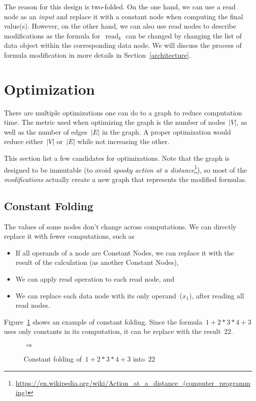 \documentclass{article}
\DeclareMathOperator{\readNode}{read}
\begin{document}
The reason for this design is two-folded.
On the one hand, we can use a read node as an \emph{input} and replace it with a constant node when computing the final value(s).
However, on the other hand, we can also use read nodes to describe modifications as the formula for~$\readNode_k$ can be changed by changing the list of data object within the corresponding data node.
We will discuss the process of formula modification in more details in Section~\ref{architecture}.

\section{Optimization}

There are multiple optimizations one can do to a graph to reduce computation time.
The metric used when optimizing the graph is the number of nodes~$|V|$, as well as the number of edges~$|E|$ in the graph.
A proper optimization would reduce either~$|V|$ or~$|E|$ while not increasing the other.

This section list a few candidates for optimizations.
Note that the graph is designed to be immutable (to avoid \emph{spooky action at a distance}\footnote{
	\url{https://en.wikipedia.org/wiki/Action_at_a_distance_(computer_programming)}
}), so most of the \emph{modifications} actually create a new graph that represents the modified formulas.

\subsection{Constant Folding}

The values of some nodes don't change across computations. We can directly replace it with fewer computations, such as
%
\begin{itemize}
	\item If all operands of a node are Constant Nodes, we can replace it with the result of the calculation (as another Constant Nodes),
	\item We can apply read operation to each read node, and
	\item We can replace each data node with its only operand~($x_1$), after reading all read nodes.
\end{itemize}
%
Figure~\ref{fig:optimization:folding-example} shows an example of constant folding.
Since the formula~$1 + 2 * 3 * 4 + 3$ uses only constants in its computation, it can be replace with the result~$22$.
%
\begin{figure}
	\centering
	\quad$\Rightarrow$\quad
	\caption{Constant folding of~$1 + 2 * 3 * 4 + 3$  into~$22$}
	\label{fig:optimization:folding-example}
\end{figure}
\end{document}
